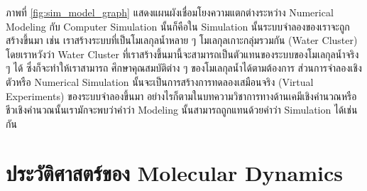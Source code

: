 ภาพที่ \ref{fig:sim_model_graph} แสดงแผนผังเชื่อมโยงความแตกต่างระหว่าง Numerical Modeling กับ Computer Simulation 
นั้นก็คือใน Simulation นั้นระบบจำลองของเราจะถูกสร้างขึ้นมา เช่น เราสร้างระบบที่เป็นโมเลกุลน้ำหลาย ๆ โมเลกุลเกาะกลุ่มรวมกัน (Water 
Cluster) โดยเราหวังว่า Water Cluster ที่เราสร้างขึ้นมานี้จะสามารถเป็นตัวแทนของระบบของโมเลกุลน้ำจริง ๆ ได้ ซึ่งก็จะทำให้เราสามารถ%
ศึกษาคุณสมบัติต่าง ๆ ของโมเลกุลน้ำได้ตามต้องการ ส่วนการจำลองเชิงตัวหรือ Numerical Simulation นั้นจะเป็นการสร้างการทดลองเสมือนจริง 
(Virtual Experiments) ของระบบจำลองขึ้นมา อย่างไรก็ตามในบทความวิชาการทางด้านเคมีเชิงคำนวณหรือชีวเชิงคำนวณนั้นเรามักจะพบว่าคำว่า 
Modeling นั้นสามารถถูกแทนด้วยคำว่า Simulation ได้เช่นกัน

\section{ประวัติศาสตร์ของ Molecular Dynamics}


